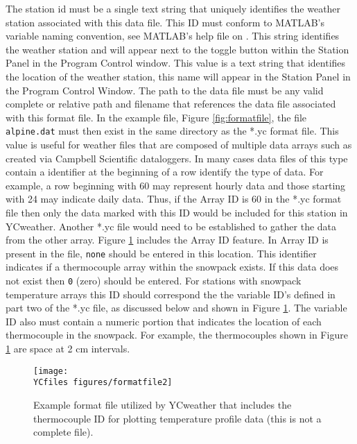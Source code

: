 \begin{enumerate}
	 The station id must be a single text string that uniquely identifies the weather station associated with this data file.  This ID must conform to MATLAB's variable naming convention, see MATLAB's help file on .
	 This string identifies the weather station and will appear next to the toggle button within the Station Panel in the Program Control window.
	 This value is a text string that identifies the location of the weather station, this name will appear in the Station Panel in the Program Control Window.
	 The path to the data file must be any valid complete or relative path and filename that references the data file associated with this format file.  In the example file, Figure \ref{fig:formatfile}, the file \texttt{alpine.dat} must then exist in the same directory as the *.yc format file.
	 This value is useful for weather files that are composed of multiple data arrays such as created via Campbell Scientific dataloggers.  In many cases data files of this type contain a identifier at the beginning of a row identify the type of data.  For example, a row beginning with 60 may represent hourly data and those starting with 24 may indicate daily data.  Thus, if the Array ID is 60 in the *.yc format file then only the data marked with this ID would be included for this station in YCweather.  Another *.yc file would need to be established to gather the data from the other array.  Figure \ref{fig:formatfile2} includes the Array ID feature.  In Array ID is present in the file, \texttt{none} should be entered in this location.
	 This identifier indicates if a thermocouple array within the snowpack exists.  If this data does not exist then \texttt{0} (zero) should be entered.  For stations with snowpack temperature arrays this ID should correspond the the variable ID's defined in part two of the *.yc file, as discussed below and shown in Figure \ref{fig:formatfile2}.  The variable ID also must contain a numeric portion that indicates the location of each thermocouple in the snowpack.  For example, the thermocouples shown in Figure \ref{fig:formatfile2} are space at 2 cm intervals.
\end{enumerate}

\begin{figure}[!ht]\centering
	\texttt{[image: \\YCfiles figures/formatfile2]}
	\caption{Example format file utilized by YCweather that includes the thermocouple ID for plotting temperature profile data (this is not a complete file).}
	\label{fig:formatfile2}
\end{figure}

